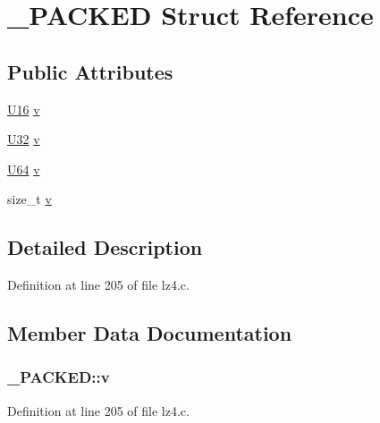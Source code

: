 \hypertarget{struct___p_a_c_k_e_d}{}\section{\+\_\+\+P\+A\+C\+K\+E\+D Struct Reference}
\label{struct___p_a_c_k_e_d}
\subsection*{Public Attributes}
\begin{DoxyCompactItemize}
\item 
\hyperlink{lz4_8c_adf928e51a60dba0df29d615401cc55a8}{U16} \hyperlink{struct___p_a_c_k_e_d_acbbe979d0dc2b7049af6402ced784710}{v}
\item 
\hyperlink{lz4_8c_ac3df7cf3c8cb172a588adec881447d68}{U32} \hyperlink{struct___p_a_c_k_e_d_a69e58b59c453f4a16003e7d1bd2c8f0e}{v}
\item 
\hyperlink{lz4_8c_a24c386d3758eba951eb7532fdbb45804}{U64} \hyperlink{struct___p_a_c_k_e_d_ae9f6a01fd931fabac1d9997e5f6441bd}{v}
\item 
size\+\_\+t \hyperlink{struct___p_a_c_k_e_d_a11e423872a08ba480796b2518e74867c}{v}
\end{DoxyCompactItemize}


\subsection{Detailed Description}


Definition at line 205 of file lz4.\+c.



\subsection{Member Data Documentation}
\hypertarget{struct___p_a_c_k_e_d_acbbe979d0dc2b7049af6402ced784710}{}
\subsubsection[{v}]{ \+\_\+\+P\+A\+C\+K\+E\+D\+::v}\label{struct___p_a_c_k_e_d_acbbe979d0dc2b7049af6402ced784710}


Definition at line 205 of file lz4.\+c.

\hypertarget{struct___p_a_c_k_e_d_a69e58b59c453f4a16003e7d1bd2c8f0e}{}

